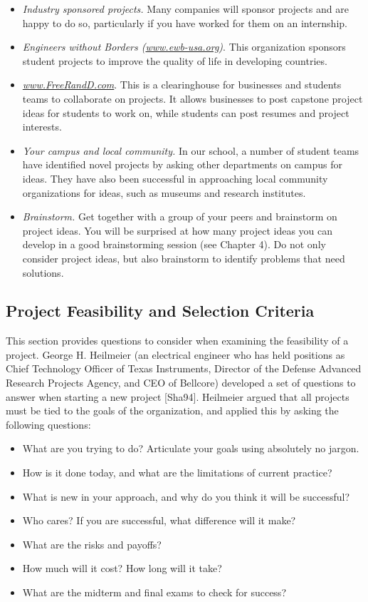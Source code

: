\begin{itemize}
\item
  \emph{Industry sponsored projects.} Many companies will sponsor
  projects and are happy to do so, particularly if you have worked for
  them on an internship.
\item
  \emph{Engineers without Borders
  (\href{http://www.ewb-usa.org}{www.ewb-usa.org})}. This organization
  sponsors student projects to improve the quality of life in developing
  countries.
\item
  \href{http://www.FreeRandD.com}{\emph{www.FreeRandD.com}}. This is a
  clearinghouse for businesses and students teams to collaborate on
  projects. It allows businesses to post capstone project ideas for
  students to work on, while students can post resumes and project
  interests.
\item
  \emph{Your campus and local community.} In our school, a number of
  student teams have identified novel projects by asking other
  departments on campus for ideas. They have also been successful in
  approaching local community organizations for ideas, such as museums
  and research institutes.
\item
  \emph{Brainstorm.} Get together with a group of your peers and
  brainstorm on project ideas. You will be surprised at how many project
  ideas you can develop in a good brainstorming session (see Chapter 4).
  Do not only consider project ideas, but also brainstorm to identify
  problems that need solutions.
\end{itemize}

\subsection{Project Feasibility and Selection
Criteria}\label{project-feasibility-and-selection-criteria}

This section provides questions to consider when examining the
feasibility of a project. George H. Heilmeier (an electrical engineer
who has held positions as Chief Technology Officer of Texas Instruments,
Director of the Defense Advanced Research Projects Agency, and CEO of
Bellcore) developed a set of questions to answer when starting a new
project {[}Sha94{]}. Heilmeier argued that all projects must be tied to
the goals of the organization, and applied this by asking the following
questions:

\begin{itemize}
\item
  What are you trying to do? Articulate your goals using absolutely no
  jargon.
\item
  How is it done today, and what are the limitations of current
  practice?
\item
  What is new in your approach, and why do you think it will be
  successful?
\item
  Who cares? If you are successful, what difference will it make?
\item
  What are the risks and payoffs?
\item
  How much will it cost? How long will it take?
\item
  What are the midterm and final exams to check for success?
\end{itemize}

